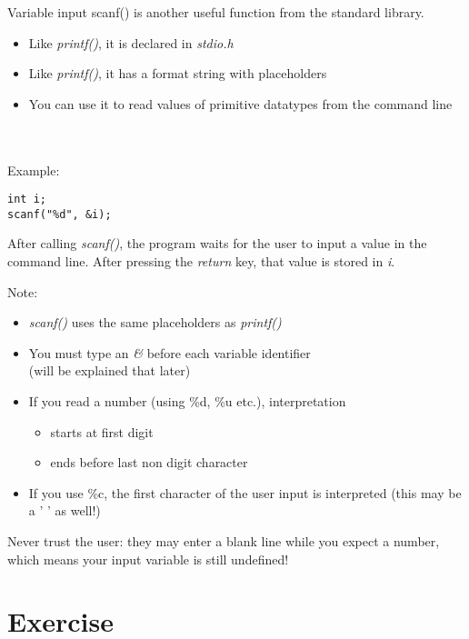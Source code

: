 \begin{frame}[fragile]{Variable input}
	scanf() is another useful function from the standard library.
	\begin{itemize}
		\item Like \textit{printf()}, it is declared in \textit{stdio.h}
		\item Like \textit{printf()}, it has a format string with placeholders
		\item You can use it to read values of primitive datatypes from the command line
	\end{itemize}
	\ \\ \ \\ Example:
	\begin{lstlisting}[numbers=none]
int i;
scanf("%d", &i);	
\end{lstlisting}
	After calling \textit{scanf()}, the program waits for the user to input a value in the command line.
	After pressing the \textit{return} key, that value is stored in \textit{i}.
\end{frame}
\begin{frame}{Note:}
	\begin{itemize}
		\item \textit{scanf()} uses the same placeholders as \textit{printf()}
		\item You must type an \textit{\&} before each variable identifier \\
			(will be explained that later)
		\item If you read a number (using \%d, \%u etc.), interpretation
		\begin{itemize}
			\item starts at first digit
			\item ends before last non digit character
		\end{itemize}
		\item If you use \%c, the first character of the user input is interpreted (this may be a ' ' as well!)
	\end{itemize}
	Never trust the user: they may enter a blank line while you expect a number, which means your input variable is still undefined!
		
\end{frame}
\section{Exercise}
\subsection{}

